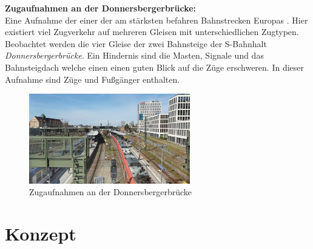 \documentclass[conference]{IEEEtran}
\begin{document}
	\textbf{Zugaufnahmen an der Donnersbergerbrücke:}\\
	Eine Aufnahme der einer der am stärksten befahren Bahnstrecken Europas \cite{z1}. Hier existiert viel Zugverkehr auf mehreren Gleisen mit unterschiedlichen Zugtypen. Beobachtet werden die vier Gleise der zwei Bahnsteige der S-Bahnhalt \textit{Donnersbergerbrücke}. Ein Hindernis sind die Masten, Signale und das Bahnsteigdach welche einen einen guten Blick auf die Züge erschweren. In dieser Aufnahme sind Züge und Fußgänger enthalten.
	\begin{figure}[!h]
		\begin{center}
			\includegraphics[width=7cm]{Media/DonnersbergerRaw.png}
			\caption{Zugaufnahmen an der Donnersbergerbrücke}
			\label{BrudermuhlRaw}
		\end{center}
	\end{figure}

	\section{Konzept}
	
\end{document}
